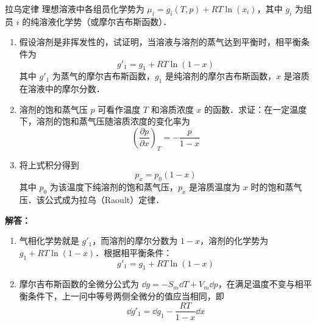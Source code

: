\begin{example}{拉乌定律}
理想溶液中各组员化学势为 $\mu_i=g_i(T,p)+RT\ln(x_i)$，其中 $g_i$ 为组员 $i$ 的纯溶液化学势（或摩尔吉布斯函数）．
\begin{enumerate}
\item 假设溶剂是非挥发性的，试证明，当溶液与溶剂的蒸气达到平衡时，相平衡条件为
\begin{equation}
g'_1=g_1+RT\ln(1-x)
\end{equation}
其中 $g'_1$ 为蒸气的摩尔吉布斯函数，$g_1$ 是纯溶剂的摩尔吉布斯函数，$x$ 是溶质在溶液中的摩尔分数．
\item 溶剂的饱和蒸气压 $p$ 可看作温度 $T$ 和溶质浓度 $x$ 的函数．求证：在一定温度下，溶剂的饱和蒸气压随溶质浓度的变化率为
\begin{equation}
\left(\frac{\partial p}{\partial x}\right)_T=-\frac{p}{1-x}
\end{equation}
\item 将上式积分得到
\begin{equation}
p_x=p_0(1-x)
\end{equation}
其中 $p_0$ 为该温度下纯溶剂的饱和蒸气压，$p_x$ 是溶质温度为 $x$ 时的饱和蒸气压．该公式成为拉乌（Raoult）定律．
\end{enumerate}
\textbf{解答：}
\begin{enumerate}
\item 气相化学势就是 $g'_1$，而溶剂的摩尔分数为 $1-x$，溶剂的化学势为$g_1+RT\ln(1-x)$．根据相平衡条件：
\begin{equation}
g'_1=g_1+RT\ln(1-x)
\end{equation}
\item 摩尔吉布斯函数的全微分公式为 $\dd g=-S_m\dd T+V_m\dd p$，在满足温度不变与相平衡条件下，上一问中等号两侧全微分的值应当相同，即
\begin{equation}
\dd g'_1=\dd g_1-\frac{RT}{1-x}\dd x
\end{equation}
\end{enumerate}
\end{example}

